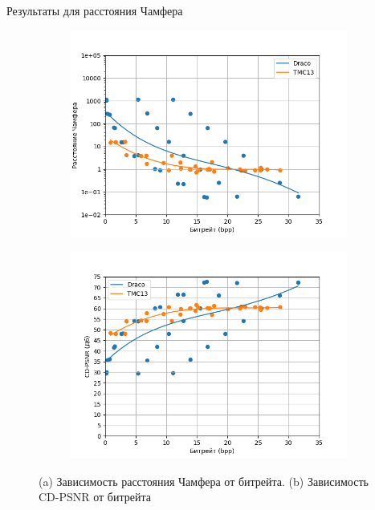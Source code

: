 \documentclass[aspectratio=169]{beamer}
\begin{document}
  \begin{frame}{Результаты для расстояния Чамфера}
    \begin{figure}[H]
        \centering
        \begin{subfigure}{0.49\textwidth}
            \includegraphics[width=\linewidth]{assets/approx_cd_p2pt.png}
            \caption{}
        \end{subfigure}
        \begin{subfigure}{0.49\textwidth}
            \includegraphics[width=\linewidth]{assets/approx_cdpsnr_p2pt.png}
            \caption{}
        \end{subfigure}
        \caption{ (a) Зависимость расстояния Чамфера от битрейта. (b) Зависимость
        CD-PSNR от битрейта }
        \label{img:pcc_arena_cd_bpp}
    \end{figure}
  \end{frame}
\end{document}
